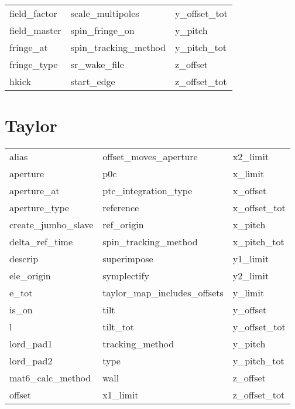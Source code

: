 \begin{tabular}{lll}
field_factor                & scale_multipoles            & y_offset_tot                \\
field_master                & spin_fringe_on              & y_pitch                     \\
fringe_at                   & spin_tracking_method        & y_pitch_tot                 \\
fringe_type                 & sr_wake_file                & z_offset                    \\
hkick                       & start_edge                  & z_offset_tot                \\
 \bottomrule
 \end{tabular}
 \vfill
 
 \section{Taylor}
 \label{s:list.taylor}
 
 \begin{tabular}{lll} \toprule
alias                       & offset_moves_aperture       & x2_limit                    \\
aperture                    & p0c                         & x_limit                     \\
aperture_at                 & ptc_integration_type        & x_offset                    \\
aperture_type               & reference                   & x_offset_tot                \\
create_jumbo_slave          & ref_origin                  & x_pitch                     \\
delta_ref_time              & spin_tracking_method        & x_pitch_tot                 \\
descrip                     & superimpose                 & y1_limit                    \\
ele_origin                  & symplectify                 & y2_limit                    \\
e_tot                       & taylor_map_includes_offsets & y_limit                     \\
is_on                       & tilt                        & y_offset                    \\
l                           & tilt_tot                    & y_offset_tot                \\
lord_pad1                   & tracking_method             & y_pitch                     \\
lord_pad2                   & type                        & y_pitch_tot                 \\
mat6_calc_method            & wall                        & z_offset                    \\
offset                      & x1_limit                    & z_offset_tot                \\
 \bottomrule
 \end{tabular}
 \vfill
 
